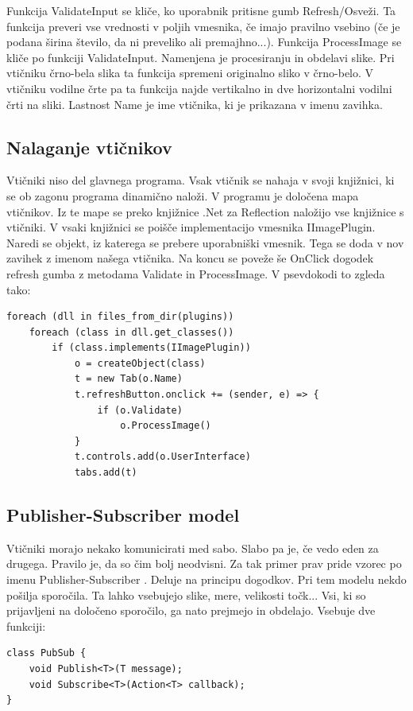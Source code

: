 \documentclass[oneside, a4paper, 12pt]{book}
\begin{document}
Funkcija ValidateInput se kliče, ko uporabnik pritisne gumb Refresh/Osveži. Ta funkcija preveri vse vrednosti v poljih vmesnika, če imajo pravilno vsebino (če je podana širina število, da ni preveliko ali premajhno...). Funkcija ProcessImage se kliče po funkciji ValidateInput. Namenjena je procesiranju in obdelavi slike. Pri vtičniku črno-bela slika ta funkcija spremeni originalno sliko v črno-belo. V vtičniku vodilne črte pa ta funkcija najde vertikalno in dve horizontalni vodilni črti na sliki. Lastnost Name je ime vtičnika, ki je prikazana v imenu zavihka.

\subsection{Nalaganje vtičnikov}
Vtičniki niso del glavnega programa. Vsak vtičnik se nahaja v svoji knjižnici, ki se ob zagonu programa dinamično naloži. V programu je določena mapa vtičnikov. Iz te mape se preko knjižnice .Net za Reflection \cite{oreilly-cs} naložijo vse knjižnice s vtičniki. V vsaki knjižnici se poišče implementacijo vmesnika IImagePlugin. Naredi se objekt, iz katerega se prebere uporabniški vmesnik. Tega se doda v nov zavihek z imenom našega vtičnika. Na koncu se poveže še OnClick dogodek refresh gumba z metodama Validate in ProcessImage. V psevdokodi to zgleda tako:
\begin{verbatim}
foreach (dll in files_from_dir(plugins))
    foreach (class in dll.get_classes())
        if (class.implements(IImagePlugin))
            o = createObject(class)
            t = new Tab(o.Name)
            t.refreshButton.onclick += (sender, e) => {
                if (o.Validate)
                    o.ProcessImage()
            }
            t.controls.add(o.UserInterface)
            tabs.add(t)
\end{verbatim}

\subsection{Publisher-Subscriber model}
Vtičniki morajo nekako komunicirati med sabo. Slabo pa je, če vedo eden za drugega. Pravilo je, da so čim bolj neodvisni. Za tak primer prav pride vzorec po imenu Publisher-Subscriber \cite{oreilly-cs, oreilly-dp}. Deluje na principu dogodkov. Pri tem modelu nekdo pošilja sporočila. Ta lahko vsebujejo slike, mere, velikosti točk... Vsi, ki so prijavljeni na določeno sporočilo, ga nato prejmejo in obdelajo. Vsebuje dve funkciji:

\begin{verbatim}
class PubSub {
    void Publish<T>(T message);
    void Subscribe<T>(Action<T> callback);
}
\end{verbatim}
\end{document}

